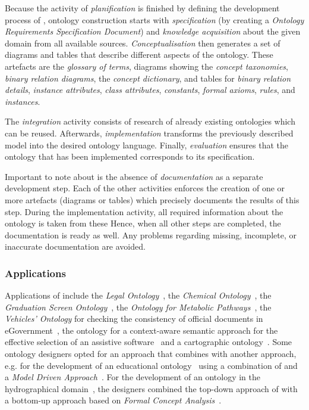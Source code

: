 Because the activity of \emph{planification} is finished by defining the development process of \methontology, ontology construction starts with \emph{specification} (by creating a \emph{Ontology Requirements Specification Document}) and \emph{knowledge acquisition} about the given domain from all available sources. \emph{Conceptualisation} then generates a set of diagrams and tables that describe different aspects of the ontology. These artefacts are the \emph{glossary of terms}, diagrams showing the \emph{concept taxonomies}, \emph{binary relation diagrams}, the \emph{concept dictionary}, and tables for \emph{binary relation details}, \emph{instance attributes}, \emph{class attributes}, \emph{constants}, \emph{formal axioms}, \emph{rules}, and \emph{instances}.

The \emph{integration} activity consists of research of already existing ontologies which can be reused. Afterwards, \emph{implementation} transforms the previously described model into the desired ontology language. Finally, \emph{evaluation} ensures that the ontology that has been implemented corresponds to its specification.

Important to note about \methontology is the absence of \emph{documentation} as a separate development step. Each of the other activities enforces the creation of one or more artefacts (diagrams or tables) which precisely documents the results of this step. During the implementation activity, all required information about the ontology is taken from these Hence, when all other steps are completed, the documentation is ready as well. Any problems regarding missing, incomplete, or inaccurate documentation are avoided.

\subsubsection{Applications}

Applications of \methontology include the \emph{Legal Ontology}~\cite{MethontologyLegal}, the \emph{Chemical Ontology}~\cite{MethontologyChemical}, the \emph{Graduation Screen Ontology}~\cite{GraduationScreenOntology}, the \emph{Ontology for Metabolic Pathways}~\cite{MetabolicPathways}, the \emph{Vehicles' Ontology} for checking the consistency of official documents in eGovernment~\cite{VehiclesOntology}, the ontology for a context-aware semantic approach for the effective selection of an assistive software~\cite{AssistiveSoftware} and a cartographic ontology~\cite{CartographicOntology}. Some ontology designers opted for an approach that combines \methontology with another approach, e.g. for the development of an educational ontology~\cite{EducationalOntology} using a combination of \methontology and a \emph{Model Driven Approach}~\cite{ModelDrivenApproach}.
For the development of an ontology in the hydrographical domain~\cite{HydrographicalOntology}, the designers combined the top-down approach of \methontology with a bottom-up approach based on \emph{Formal Concept Analysis}~\cite{FormalConceptAnalysis}.

